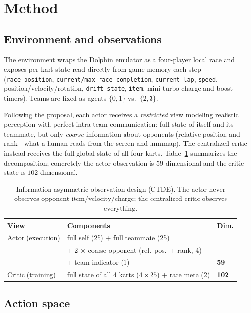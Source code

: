 \documentclass{article}
\begin{document}
\section{Method}

\subsection{Environment and observations}

The environment wraps the Dolphin emulator as a four-player local race and
exposes per-kart state read directly from game memory each step
(\texttt{race\_position}, \texttt{current/max\_race\_completion},
\texttt{current\_lap}, \texttt{speed}, position/velocity/rotation,
\texttt{drift\_state}, \texttt{item}, mini-turbo charge and boost timers).
Teams are fixed as agents $\{0,1\}$ vs.\ $\{2,3\}$.

Following the proposal, each actor receives a \emph{restricted} view modeling
realistic perception with perfect intra-team communication: full state of itself
and its teammate, but only \emph{coarse} information about opponents (relative
position and rank---what a human reads from the screen and minimap). The
centralized critic instead receives the full global state of all four karts.
Table~\ref{tab:obs} summarizes the decomposition; concretely the actor
observation is $59$-dimensional and the critic state is $102$-dimensional.

\begin{table}[t]
  \caption{Information-asymmetric observation design (CTDE). The actor never
  observes opponent item/velocity/charge; the centralized critic observes
  everything.}
  \label{tab:obs}
  \centering
  \begin{tabular}{lll}
    \toprule
    View & Components & Dim. \\
    \midrule
    Actor (execution)  & full self (25) + full teammate (25)                & \\
                       & + 2 $\times$ coarse opponent (rel.\ pos.\ + rank, 4) & \\
                       & + team indicator (1)                                & \textbf{59} \\
    \midrule
    Critic (training)  & full state of all 4 karts ($4\times25$) + race meta (2) & \textbf{102} \\
    \bottomrule
  \end{tabular}
\end{table}

\subsection{Action space}
\end{document}
